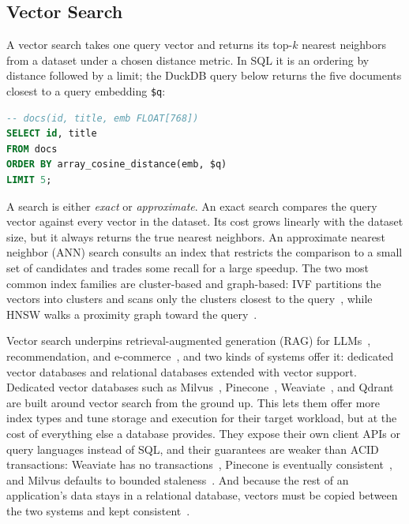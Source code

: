 \subsection{Vector Search}\label{subsec:vector-search}

A vector search takes one query vector and returns its top-$k$ nearest neighbors from a dataset under a chosen distance metric.
In SQL it is an ordering by distance followed by a limit; the DuckDB query below returns the five documents closest to a query embedding \texttt{\$q}:

\begin{lstlisting}[language=SQL, basicstyle=\ttfamily\small, frame=none]
-- docs(id, title, emb FLOAT[768])
SELECT id, title
FROM docs
ORDER BY array_cosine_distance(emb, $q)
LIMIT 5;
\end{lstlisting}

A search is either \textit{exact} or \textit{approximate}.
An exact search compares the query vector against every vector in the dataset.
Its cost grows linearly with the dataset size, but it always returns the true nearest neighbors.
An approximate nearest neighbor (ANN) search consults an index that restricts the comparison to a small set of candidates and trades some recall for a large speedup.
The two most common index families are cluster-based and graph-based: IVF partitions the vectors into clusters and scans only the clusters closest to the query~\cite{JegouPQ11}, while HNSW walks a proximity graph toward the query~\cite{MalkovYashunin20}.

Vector search underpins retrieval-augmented generation (RAG) for LLMs~\cite{LewisRAG20}, recommendation, and e-commerce~\cite{PanWangLi24, WangMilvus21}, and two kinds of systems offer it: dedicated vector databases and relational databases extended with vector support.
Dedicated vector databases such as Milvus~\cite{WangMilvus21}, Pinecone~\cite{PineconeDocs}, Weaviate~\cite{WeaviateDocs}, and Qdrant~\cite{QdrantDocs} are built around vector search from the ground up.
This lets them offer more index types and tune storage and execution for their target workload, but at the cost of everything else a database provides.
They expose their own client APIs or query languages instead of SQL, and their guarantees are weaker than ACID transactions: Weaviate has no transactions~\cite{WeaviateFAQ}, Pinecone is eventually consistent~\cite{PineconeFreshness}, and Milvus defaults to bounded staleness~\cite{MilvusConsistency}.
And because the rest of an application's data stays in a relational database, vectors must be copied between the two systems and kept consistent~\cite{ChenSingleStoreV24}.

